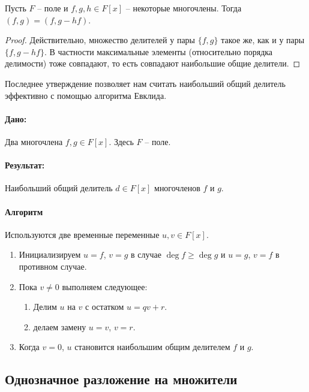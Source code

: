 \begin{claim}
Пусть $F$ -- поле и $f, g, h\in F[x]$ -- некоторые многочлены.
Тогда $(f, g) = (f, g - hf)$.
\end{claim}
\begin{proof}
Действительно, множество делителей у пары $\{f, g\}$ такое же, как и у пары $\{f, g-hf\}$.
В частности максимальные элементы (относительно порядка делимости) тоже совпадают, то есть совпадают наибольшие общие делители.
\end{proof}

Последнее утверждение позволяет нам считать наибольший общий делитель эффективно с помощью алгоритма Евклида.

\paragraph{Дано:}

Два многочлена $f, g\in F[x]$.
Здесь $F$ -- поле.

\paragraph{Результат:}

Наибольший общий делитель $d\in F[x]$ многочленов $f$ и $g$.

\paragraph{Алгоритм}

Используются две временные переменные $u, v\in F[x]$.

\begin{enumerate}
\item Инициализируем $u = f$, $v = g$ в случае $\deg f \geqslant \deg g$ и $u = g$, $v = f$ в противном случае.

\item Пока $v \neq 0$ выполняем следующее:
\begin{enumerate}
\item Делим $u$ на $v$ с остатком $u = q v + r$.

\item делаем замену $u = v$, $v = r$.
\end{enumerate}

\item Когда $v = 0$, $u$ становится наибольшим общим делителем $f$ и $g$.
\end{enumerate}

\subsection{Однозначное разложение на множители}

